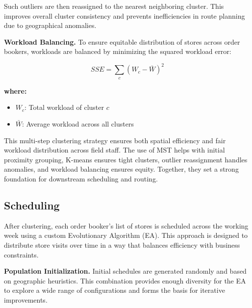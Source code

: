
Such outliers are then reassigned to the nearest neighboring cluster. This improves overall cluster consistency and prevents inefficiencies in route planning due to geographical anomalies.

\textbf{Workload Balancing.} To ensure equitable distribution of stores across order bookers, workloads are balanced by minimizing the squared workload error:

\[
SSE = \sum_{c}(W_c - \bar{W})^2
\]

\textbf{where:}
\begin{itemize}
  \item $W_c$: Total workload of cluster $c$ 
  \item $\bar{W}$: Average workload across all clusters
\end{itemize}

This multi-step clustering strategy ensures both spatial efficiency and fair workload distribution across field staff. The use of MST helps with initial proximity grouping, K-means ensures tight clusters, outlier reassignment handles anomalies, and workload balancing ensures equity. Together, they set a strong foundation for downstream scheduling and routing.

\subsection{Scheduling}

After clustering, each order booker’s list of stores is scheduled across the working week using a custom Evolutionary Algorithm (EA). This approach is designed to distribute store visits over time in a way that balances efficiency with business constraints.

\textbf{Population Initialization.} Initial schedules are generated randomly and based on geographic heuristics. This combination provides enough diversity for the EA to explore a wide range of configurations and forms the basis for iterative improvements.

